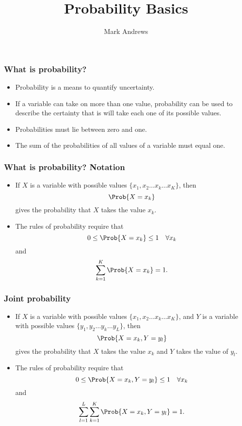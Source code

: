 \documentclass[10pt,xcolor=dvipsnames,serif,professionalfont]{beamer} %
\title[Probability]{Probability Basics}
\author[Andrews]{Mark Andrews}
\date{}
\begin{document}
{
\begin{frame}
   \titlepage
\end{frame}
}
\begin{frame}
\frametitle{What is probability?}
\begin{itemize}
\item Probability is a means to quantify uncertainty.
\item If a variable can take on more than one value, probability can be used to describe the certainty that is will take each one of its possible values.
\item Probabilities must lie between zero and one.
\item The sum of the probabilities of all values of a variable must equal one.
\end{itemize}
\end{frame}

\begin{frame}
\frametitle{What is probability? Notation}
\begin{itemize}
\item If $X$ is a variable with possible values $\{x_1, x_2 \ldots x_k \ldots x_K\}$, then 
\begin{equation}
\Prob{X = x_k} 
\end{equation}
gives the probability that $X$ takes the value $x_k$.
\item The rules of probability require that
\begin{equation}
0 \leq \Prob{X = x_k} \leq 1 \quad \forall x_k 
\end{equation}
and
\begin{equation}
\sum_{k=1}^K \Prob{X = x_k} = 1.
\end{equation}

\end{itemize}
\end{frame}

\begin{frame}
	\frametitle{Joint probability}
\begin{itemize}
\item If $X$ is a variable with possible values $\{x_1, x_2 \ldots x_k \ldots x_K\}$, and $Y$ is a variable with possible values $\{y_1, y_2 \ldots y_k \ldots y_L\}$, then
\begin{equation}
\Prob{X = x_k, Y = y_l} 
\end{equation}
gives the probability that $X$ takes the value $x_k$ and $Y$ takes the value of $y_l$.
\item The rules of probability require that
\begin{equation}
0 \leq \Prob{X = x_k, Y = y_l} \leq 1 \quad \forall x_k 
\end{equation}
and
\begin{equation}
	\sum_{l=1}^L \sum_{k=1}^K \Prob{X = x_k, Y = y_l} = 1.
\end{equation}

\end{itemize}
\end{frame}
\end{document}
